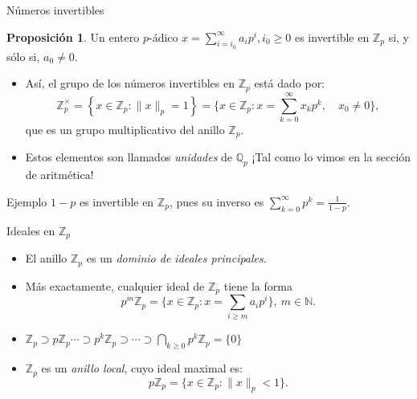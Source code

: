 \documentclass{beamer}
\newcommand{\bb}[1]{\mathbb{#1}}
\theoremstyle{definition}
\numberwithin{equation}{section}
\newcommand{\orangee}[1]{\textcolor{thColor}{#1}}
\newtheorem{pr}{\orangee{Proposición}}
\newcommand{\tit}[1]{\textit{#1}}
\renewcommand{\geq}{\geqslant}
\newcommand{\Qp}{\mathbb{Q}_p}
\newcommand{\Zp}{\mathbb{Z}_p}
\newcommand{\pnorm}[1]{\|#1\|_p}
\begin{document}
\begin{frame}{Números invertibles}
\begin{pr}
	Un entero $p$-ádico $x=\sum_{i=i_{0}}^{\infty}a_{i}p^{i},i_{0}\geq0$ es invertible en $\Zp$ si, y sólo si, $a_0\neq 0$.
\end{pr}
\begin{itemize}
	\item Así, el grupo de los números invertibles en $\Zp$ está dado por:
	$$
	\mathbb{Z}_{p}^{\times}=\left\{x \in \mathbb{Z}_{p}:\pnorm{x}=1\right\}=\Big\{x \in \mathbb{Z}_{p}: x=\sum_{k=0}^{\infty} x_{k} p^{k}, \quad x_{0} \neq 0\Big\},$$
	que es un grupo multiplicativo del anillo $\Zp$.
	\item Estos elementos son llamados \tit{unidades} de $\Qp$ ¡Tal como lo vimos en la sección de aritmética!
\end{itemize}
\begin{exampleblock}{Ejemplo}
	$1-p$ es invertible en $\Zp$, pues su inverso es $\sum_{k=0}^{\infty}p^k=\frac{1}{1-p}.$
\end{exampleblock}
\end{frame}

\begin{frame}{Ideales en $\Zp$}
	\begin{itemize}[<+- | alert@+>]
		\item El anillo $\Zp$ es un \textit{dominio de ideales principales}.
		\item Más exactamente, cualquier ideal de $\mathbb{Z}_{p}$ tiene la forma
		\[
		p^{m}\mathbb{Z}_{p}=\Big\{x\in\mathbb{Z}_{p}:x=\sum_{i\geq m}a_{i}p^{i}%
		\Big\},\ m\in\mathbb{N}.
		\]
		\item $\mathbb{Z}_{p} \supset p \mathbb{Z}_{p} \cdots \supset p^{k} \mathbb{Z}_{p} \supset \cdots \supset \bigcap_{k \geq 0} p^{k} \mathbb{Z}_{p}=\{0\}$
		\item $\bb{Z}_p$ es un \tit{anillo local}, cuyo ideal maximal es:
		$$p\bb{Z}_p = \{x\in\bb{Z}_p : \pnorm{x}<1\}.$$
	\end{itemize}
\end{frame}
\end{document}
